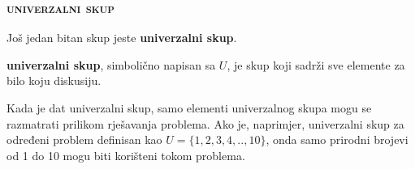 \documentclass[a4paper,14pt,svgnames]{article}
\begin{document}
\subsubsection{\textsc{univerzalni skup}}
\bigskip\bigskip
Još jedan bitan skup jeste \textbf{univerzalni skup}.\smallskip

\begin{tcolorbox}
\textbf{univerzalni skup}, simbolično napisan sa $U$, je skup koji sadrži sve elemente za bilo koju diskusiju.
\end{tcolorbox}\medskip

Kada je dat univerzalni skup, samo elementi univerzalnog skupa mogu se razmatrati prilikom rješavanja problema. Ako je, naprimjer, univerzalni skup za određeni problem definisan kao $U=\{1, 2, 3, 4, .., 10\}$, onda samo prirodni brojevi od 1 do 10 mogu biti korišteni tokom problema.
\end{document}
